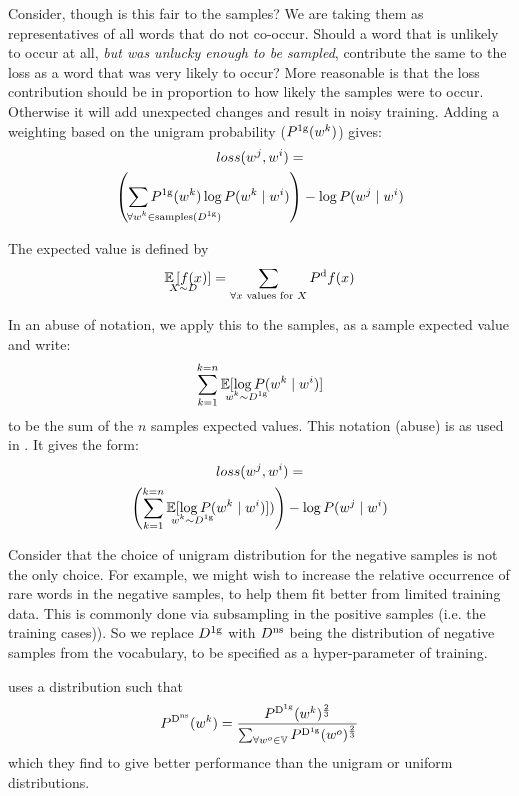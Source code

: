 \documentclass[parskip]{komatufte}
\begin{document}
Consider, though is this fair to the samples?
We are taking them as representatives of all words that do not co-occur.
Should a word that is unlikely to occur at all, \emph{but was unlucky enough to be sampled}, contribute the same to the loss as a word that was very likely to occur?
More reasonable is that the loss contribution should be in proportion to how likely the samples were to occur.
Otherwise it will add unexpected changes and result in noisy training.
Adding a weighting based on the unigram probability ($\d P_{1g}(\n w_k)$) gives:
%
\begin{multline}
loss(\n w_j,\n w_i) = \\
\left(\sum_{\mathrlap{\!\!\!\!\!\!\forall \n w_k \in \text{samples}(\d D_{1g})}}
\d P_{1g}(\n w_k) \log P(\n w_k\mid \n w_i) \right)
-\log P(\n w_j\mid \n w_i)
\end{multline}


The expected value is defined by
\begin{equation}
\expected_{X \sim D} \left[ f(x) \right]= \sum_{\text{$\forall x$ values for $X$}} \d P_d f(x)
\end{equation}

In an abuse of notation, we apply this to the samples, as a sample expected value and write:
\begin{equation}
	\sum_{k=1}^{k=n} \expected_{\n w_k \sim \d D_{1g}} [\log P(\n w_k\mid \n w_i)]
\end{equation}
to be the sum of the $n$ samples expected values.
This notation (abuse) is as used in .
It gives the form:
\begin{multline}
loss(\n w_j,\n w_i) = \\
\left(\sum_{k=1}^{k=n} \expected_{\n w_k \sim \d D_{1g}} [\log P(\n w_k\mid \n w_i)]) \right)
-\log P(\n w_j\mid \n w_i)
\end{multline}

Consider that the choice of unigram distribution for the negative samples is not the only choice.
For example, we might wish to increase the relative occurrence of rare words in the negative samples, to help them fit better from limited training data.
This is commonly done via subsampling in the positive samples (i.e. the training cases)).
So we replace $\d D_{1g}$ with $\d D_{ns}$ being the distribution of negative samples from the vocabulary,
to be specified as a hyper-parameter of training.

\textcite{mikolovSkip} uses a distribution such that 
\begin{equation}
\d P_{\d D_{ns}}(\n w_k) =  \frac{\d P_{\d D_{1g}}(\n w_k)^{\frac{2}{3}}}{\sum_{\forall \n w_o\in \set{V}} \d P_{\d D_{1g}}(\n w_o)^{\frac{2}{3}}}
\end{equation}
which they find to give better performance than the unigram or uniform distributions.
\end{document}
